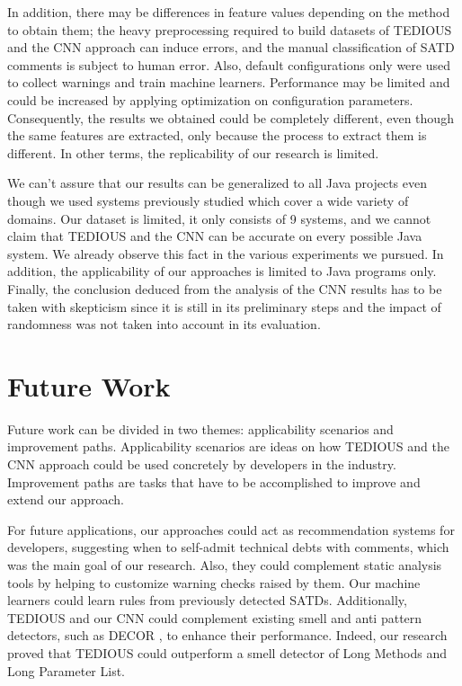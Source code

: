 In addition, there may be differences in feature values depending on the method to obtain them; the heavy preprocessing required to build datasets of TEDIOUS and the CNN approach can induce errors, and the manual classification of SATD comments is subject to human error. Also, default configurations only were used to collect warnings and train machine learners. Performance may be limited and could be increased by applying optimization on configuration parameters. Consequently, the results we obtained could be completely different, even though the same features are extracted, only because the process to extract them is different. In other terms, the replicability of our research is limited.

We can't assure that our results can be generalized to all Java projects even though we used systems previously studied \citep{maldonado17} which cover a wide variety of domains. Our dataset is limited, it only consists of 9 systems, and we cannot claim that TEDIOUS and the CNN can be accurate on every possible Java system. We already observe this fact in the various experiments we pursued. In addition, the applicability of our approaches is limited to Java programs only. Finally, the conclusion deduced from the analysis of the CNN results has to be taken with skepticism since it is still in its preliminary steps and the impact of randomness was not taken into account in its evaluation.

\section{Future Work}


Future work can be divided in two themes: applicability scenarios and improvement paths. Applicability scenarios are ideas on how TEDIOUS and the CNN approach could be used concretely by developers in the industry. Improvement paths are tasks that have to be accomplished to improve and extend our approach.

For future applications, our approaches could act as recommendation systems for developers, suggesting when to self-admit technical debts with comments, which was the main goal of our research. Also, they could complement static analysis tools by helping to customize warning checks raised by them. Our machine learners could learn rules from previously detected SATDs. Additionally, TEDIOUS and our CNN could complement existing smell and anti pattern detectors, such as DECOR \citep{moha2010decor}, to enhance their performance. Indeed, our research proved that TEDIOUS could outperform a smell detector of Long Methods and Long Parameter List.


